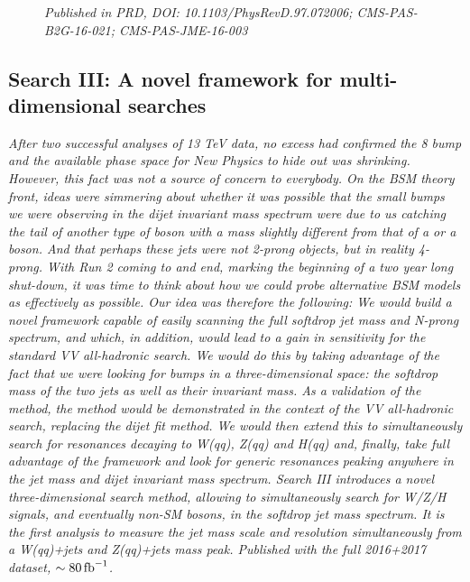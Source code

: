 \begin{singlespace}
\begin{figure}[b!]
    \vspace*{10mm}
    \caption*{\footnotesize{\textit{Published in PRD, DOI: 10.1103/PhysRevD.97.072006; CMS-PAS-B2G-16-021; CMS-PAS-JME-16-003}}}
\end{figure}
\vspace*{\fill}
\end{singlespace}

\clearpage

\clearpage

\begin{singlespace}
\vspace*{\fill}
\begin{centering}
\section{Search III: A novel framework for multi-dimensional searches}
\label{searchIII}
\textit{
After two successful analyses of 13 TeV data, no excess had confirmed the 8 \TeV bump and the available phase space for New Physics to hide out was shrinking. However, this fact was not a source of concern to everybody. On the BSM theory front, ideas were simmering about whether it was possible that the small bumps we were observing in the dijet invariant mass spectrum were due to us catching the tail of another type of boson with a mass slightly different from that of a \PW or a \PZ boson. And that perhaps these jets were not 2-prong objects, but in reality 4-prong. With Run 2 coming to and end, marking the beginning of a two year long shut-down, it was time to think about how we could probe alternative BSM models as effectively as possible. Our idea was therefore the following: We would build a novel framework capable of easily scanning the full softdrop jet mass and N-prong spectrum, and which, in addition, would lead to a gain in sensitivity for the standard VV all-hadronic search. We would do this by taking advantage of the fact that we were looking for bumps in a three-dimensional space: the softdrop mass of the two jets as well as their invariant mass. As a validation of the method, the method would be demonstrated in the context of the VV all-hadronic search, replacing the dijet fit method. We would then extend this to simultaneously search for resonances decaying to W(qq), Z(qq) and H(qq) and, finally, take full advantage of the framework and look for generic resonances peaking anywhere in the jet mass and dijet invariant mass spectrum.
\newline
\newline
Search III introduces a novel three-dimensional search method, allowing to simultaneously search for W/Z/H signals, and eventually non-SM bosons, in the softdrop jet mass spectrum. It is the first analysis to measure the jet mass scale and resolution simultaneously from a W(qq)+jets and Z(qq)+jets mass peak. Published with the full 2016+2017 dataset, $\sim 80 \mbox{\ensuremath{\,\text{fb}^\text{$-$1}}}$.}

\end{centering}
\end{singlespace}
